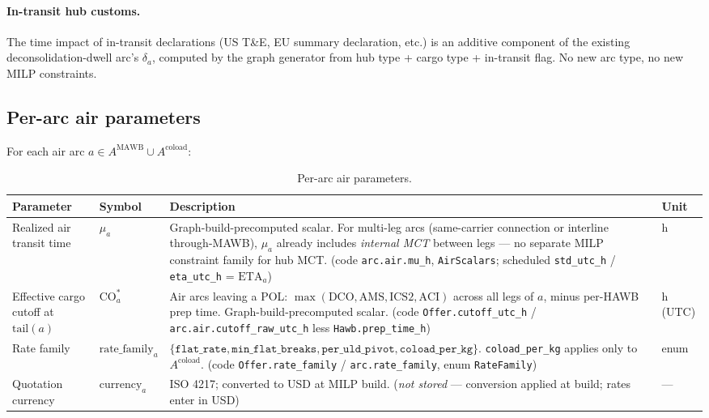 \documentclass[11pt,a4paper]{article}
\theoremstyle{definition}
\begin{document}
\paragraph{In-transit hub customs.}
The time impact of in-transit declarations (US T\&E, EU summary declaration,
etc.) is an additive component of the existing deconsolidation-dwell arc's
$\delta_a$, computed by the graph generator from hub type + cargo type +
in-transit flag. No new arc type, no new MILP constraints.

\subsection{Per-arc air parameters}
\label{sec:air-arc-params}

For each air arc $a \in A^{\text{MAWB}} \cup A^{\text{coload}}$:

\begin{table}[H]
\centering
\caption{Per-arc air parameters.}
\label{tab:air-arc-params}
\begin{tabular}{p{3cm}p{2.2cm}p{7cm}p{1.5cm}}
\toprule
Parameter & Symbol & Description & Unit \\
\midrule
Realized air transit time & $\mu_a$ & Graph-build-precomputed scalar. For multi-leg arcs (same-carrier connection or interline through-MAWB), $\mu_a$ already includes \emph{internal MCT} between legs --- no separate MILP constraint family for hub MCT. (code \texttt{arc.air.mu\_h}, \texttt{AirScalars}; scheduled \texttt{std\_utc\_h} / \texttt{eta\_utc\_h} = $\text{ETA}_a$) & h \\
Effective cargo cutoff at $\text{tail}(a)$ & $\text{CO}_a^*$ & Air arcs leaving a POL: $\max(\text{DCO}, \text{AMS}, \text{ICS2}, \text{ACI})$ across all legs of $a$, minus per-HAWB prep time. Graph-build-precomputed scalar. (code \texttt{Offer.cutoff\_utc\_h} / \texttt{arc.air.cutoff\_raw\_utc\_h} less \texttt{Hawb.prep\_time\_h}) & h (UTC) \\
Rate family & $\text{rate\_family}_a$ & $\{\texttt{flat\_rate}, \texttt{min\_flat\_breaks}, \texttt{per\_uld\_pivot}, \texttt{coload\_per\_kg}\}$. \texttt{coload\_per\_kg} applies only to $A^{\text{coload}}$. (code \texttt{Offer.rate\_family} / \texttt{arc.rate\_family}, enum \texttt{RateFamily}) & enum \\
Quotation currency & $\text{currency}_a$ & ISO 4217; converted to USD at MILP build. (\emph{not stored} --- conversion applied at build; rates enter in USD) & --- \\
\bottomrule
\end{tabular}
\end{table}
\end{document}

